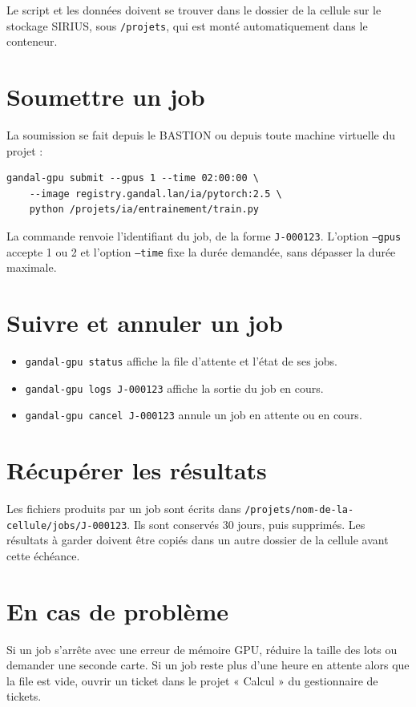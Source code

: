 \documentclass[11pt,a4paper]{article}
\begin{document}
Le script et les données doivent se trouver dans le dossier de la cellule sur le stockage SIRIUS, sous \texttt{/projets}, qui est monté automatiquement dans le conteneur.

\section{Soumettre un job}
La soumission se fait depuis le BASTION ou depuis toute machine virtuelle du projet :

\begin{verbatim}
gandal-gpu submit --gpus 1 --time 02:00:00 \
    --image registry.gandal.lan/ia/pytorch:2.5 \
    python /projets/ia/entrainement/train.py
\end{verbatim}

La commande renvoie l'identifiant du job, de la forme \texttt{J-000123}. L'option \texttt{--gpus} accepte 1 ou 2 et l'option \texttt{--time} fixe la durée demandée, sans dépasser la durée maximale.

\section{Suivre et annuler un job}
\begin{itemize}
\item \texttt{gandal-gpu status} affiche la file d'attente et l'état de ses jobs.
\item \texttt{gandal-gpu logs J-000123} affiche la sortie du job en cours.
\item \texttt{gandal-gpu cancel J-000123} annule un job en attente ou en cours.
\end{itemize}

\section{Récupérer les résultats}
Les fichiers produits par un job sont écrits dans \texttt{/projets/nom-de-la-cellule/jobs/J-000123}. Ils sont conservés 30 jours, puis supprimés. Les résultats à garder doivent être copiés dans un autre dossier de la cellule avant cette échéance.

\section{En cas de problème}
Si un job s'arrête avec une erreur de mémoire GPU, réduire la taille des lots ou demander une seconde carte. Si un job reste plus d'une heure en attente alors que la file est vide, ouvrir un ticket dans le projet « Calcul » du gestionnaire de tickets.
\end{document}
